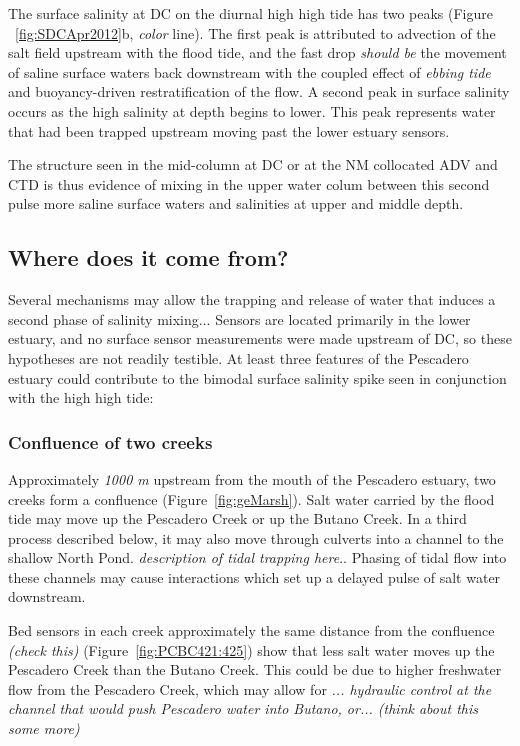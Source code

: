 The surface salinity at DC on the diurnal high high tide has two peaks (Figure ~\ref{fig:SDCApr2012}b, \emph{color} line). The first peak is attributed to advection of the salt field upstream with the flood tide, and the fast drop \emph{should be} the movement of saline surface waters back downstream with the coupled effect of \emph{ebbing tide} and buoyancy-driven restratification of the flow. A second peak in surface salinity occurs as the high salinity at depth begins to lower. This peak represents water that had been trapped upstream moving past the lower estuary sensors. 

The structure seen in the mid-column at DC or at the NM collocated ADV and CTD is thus evidence of mixing in the upper water colum between this second pulse more saline surface waters and salinities at upper and middle depth. 

\subsection{Where does it come from?}

Several mechanisms may allow the trapping and release of water that induces a second phase of salinity mixing... Sensors are located primarily in the lower estuary, and no surface sensor measurements were made upstream of DC, so these hypotheses are not readily testible. At least three features of the Pescadero estuary could contribute to the bimodal surface salinity spike seen in conjunction with the high high tide:

\subsubsection{Confluence of two creeks}
Approximately \emph{1000 m} upstream from the mouth of the Pescadero estuary, two creeks form a confluence (Figure~\ref{fig:geMarsh}). Salt water carried by the flood tide may move up the Pescadero Creek or up the Butano Creek. In a third process described below, it may also move through culverts into a channel to the shallow North Pond. \emph{description of tidal trapping here}.. Phasing of tidal flow into these channels may cause interactions which set up a delayed pulse of salt water downstream. 

Bed sensors in each creek approximately the same distance from the confluence \emph{(check this)} (Figure~\ref{fig:PCBC421:425}) show that less salt water moves up the Pescadero Creek than the Butano Creek. This could be due to higher freshwater flow from the Pescadero Creek, which may allow for \emph{... hydraulic control at the channel that would push Pescadero water into Butano, or... (think about this some more)} 

